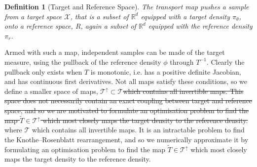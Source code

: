 \documentclass[final]{siamltex}
\newcommand{\edit}[1]{{\color{red} #1}}  %
\newtheorem{dfn}{Definition}[section]
\providecommand{\DIFadd}[1]{{\protect\color{blue}\uwave{#1}}} %
\providecommand{\DIFdel}[1]{{\protect\color{red}\sout{#1}}}                      %
\providecommand{\DIFaddbegin}{} %
\providecommand{\DIFaddend}{} %
\providecommand{\DIFdelbegin}{} %
\providecommand{\DIFdelend}{} %
\newcommand{\DIFscaledelfig}{0.5}
\newlength{\DIFdelgraphicswidth} %
\newlength{\DIFdelgraphicsheight} %
\newcommand{\DIFaddincludegraphics}[2][]{{\color{blue}\fbox{\DIFOincludegraphics[#1]{#2}}}} %
\newcommand{\DIFdelincludegraphics}[2][]{%
\sbox{\DIFdelgraphicsbox}{\DIFOincludegraphics[#1]{#2}}%
\settoboxwidth{\DIFdelgraphicswidth}{\DIFdelgraphicsbox} %
\settoboxtotalheight{\DIFdelgraphicsheight}{\DIFdelgraphicsbox} %
\scalebox{\DIFscaledelfig}{%
\parbox[b]{\DIFdelgraphicswidth}{\usebox{\DIFdelgraphicsbox}\\[-\baselineskip] \rule{\DIFdelgraphicswidth}{0em}}\llap{\resizebox{\DIFdelgraphicswidth}{\DIFdelgraphicsheight}{%
\setlength{\unitlength}{\DIFdelgraphicswidth}%
\begin{picture}(1,1)%
\thicklines\linethickness{2pt} %
{\color[rgb]{1,0,0}\put(0,0){\framebox(1,1){}}}%
{\color[rgb]{1,0,0}\put(0,0){\line( 1,1){1}}}%
{\color[rgb]{1,0,0}\put(0,1){\line(1,-1){1}}}%
\end{picture}%
}\hspace*{3pt}}} %
} %
\DeclareRobustCommand{\DIFaddbegin}{\DIFOaddbegin \let\includegraphics\DIFaddincludegraphics} %
\DeclareRobustCommand{\DIFaddend}{\DIFOaddend \let\includegraphics\DIFOincludegraphics} %
\DeclareRobustCommand{\DIFdelbegin}{\DIFOdelbegin \let\includegraphics\DIFdelincludegraphics} %
\DeclareRobustCommand{\DIFdelend}{\DIFOaddend \let\includegraphics\DIFOincludegraphics} %
\begin{document}
\begin{dfn}[Target and Reference Space]
	The transport map pushes a sample from a {\it target space} $\mathcal{X}$, that is a subset of $\mathbb{R}^d$ equipped with a target density $\pi_{\theta}$, onto a {\it reference space}, $R$, again a subset of $\mathbb{R}^d$ equipped with the reference density $\pi_r$.
\end{dfn}

Armed with such a map, independent samples can be made of the target
measure, using the pullback of the reference density $\phi$ through $T^{-1}$.
Clearly the pullback only exists when $T$ is monotonic, i.e. has a positive definite Jacobian, and has continuous first derivatives.
Not all maps satisfy these conditions, so we define a smaller space of
maps, $\mathcal{T}^\uparrow \subset \mathcal{T}$\DIFdelbegin \DIFdel{which contains all
invertible maps. This space does not necessarily contain an exact
coupling between target and reference space, and so we are motivated to formulate an optimisation problem to find the map $\tilde{T}
\in \mathcal{T}^\uparrow$ which most closely maps the target density
to the reference density.
}\DIFdelend \DIFaddbegin \DIFadd{, }\edit{ where $\mathcal{T}$ which contains all
invertible maps. It is an intractable problem to find the
  Knothe–Rosenblatt rearrangement, and so we numerically approximate
  it by formulating an optimisation problem to find the map $\tilde{T}
\in \mathcal{T}^\uparrow$ which most closely maps the target density
to the reference density.}
\DIFaddend 

\end{document}
